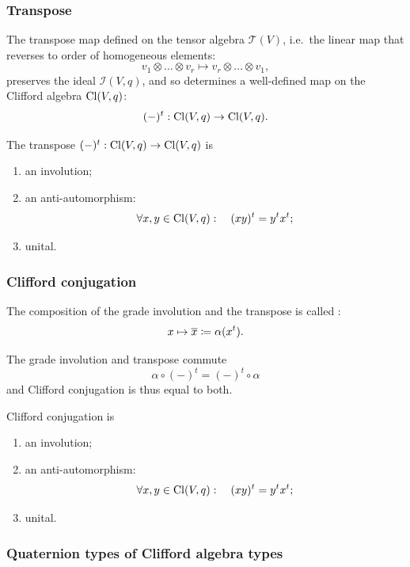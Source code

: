 \subsubsection{Transpose}
The transpose map defined on the tensor algebra $\mathcal{T}(V)$, i.e.\ the linear map that reverses to order of homogeneous elements:
\[ v_1\otimes \ldots \otimes v_r \mapsto v_r \otimes \ldots \otimes v_1, \]
preserves the ideal $\mathcal{I}(V,q)$, and so determines a well-defined map on the Clifford algebra $\operatorname{Cl}(V,q)$:
\[ (-)^t: \operatorname{Cl}(V,q)\to \operatorname{Cl}(V,q). \]
\begin{lemma}
The transpose $(-)^t: \operatorname{Cl}(V,q)\to \operatorname{Cl}(V,q)$ is
\begin{enumerate}
\item an involution;
\item an anti-automorphism:
\[ \forall x,y\in \operatorname{Cl}(V,q): \quad (xy)^t = y^tx^t; \]
\item unital.
\end{enumerate}
\end{lemma}

\subsubsection{Clifford conjugation}
\begin{definition}
The composition of the grade involution and the transpose is called :
\[ x\mapsto \overline{x} \coloneqq \alpha(x^t). \]
\end{definition}
\begin{lemma}
The grade involution and transpose commute
\[ \alpha \circ(-)^t = (-)^t\circ \alpha \]
and Clifford conjugation is thus equal to both.
\end{lemma}

\begin{lemma}
Clifford conjugation is
\begin{enumerate}
\item an involution;
\item an anti-automorphism:
\[ \forall x,y\in \operatorname{Cl}(V,q): \quad (xy)^t = y^tx^t; \]
\item unital.
\end{enumerate}
\end{lemma}

\subsubsection{Quaternion types of Clifford algebra types}

